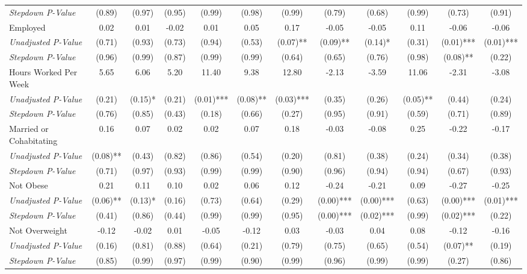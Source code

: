 \begin{tabular}{l c c c c c c c c c c c}
\quad \textit{Stepdown P-Value} & (0.89) & (0.97) & (0.95) & (0.99) & (0.98) & (0.99) & (0.79) & (0.68) & (0.99) & (0.73) & (0.91) \\
Employed & 0.02 & 0.01 & -0.02 & 0.01 & 0.05 & 0.17 & -0.05 & -0.05 & 0.11 & -0.06 & -0.06 \\
\quad \textit{Unadjusted P-Value} & (0.71) & (0.93) & (0.73) & (0.94) & (0.53) & (0.07)** & (0.09)** & (0.14)* & (0.31) & (0.01)*** & (0.01)*** \\
\quad \textit{Stepdown P-Value} & (0.96) & (0.99) & (0.87) & (0.99) & (0.99) & (0.64) & (0.65) & (0.76) & (0.98) & (0.08)** & (0.22) \\
Hours Worked Per Week & 5.65 & 6.06 & 5.20 & 11.40 & 9.38 & 12.80 & -2.13 & -3.59 & 11.06 & -2.31 & -3.08 \\
\quad \textit{Unadjusted P-Value} & (0.21) & (0.15)* & (0.21) & (0.01)*** & (0.08)** & (0.03)*** & (0.35) & (0.26) & (0.05)** & (0.44) & (0.24) \\
\quad \textit{Stepdown P-Value} & (0.76) & (0.85) & (0.43) & (0.18) & (0.66) & (0.27) & (0.95) & (0.91) & (0.59) & (0.71) & (0.89) \\
Married or Cohabitating & 0.16 & 0.07 & 0.02 & 0.02 & 0.07 & 0.18 & -0.03 & -0.08 & 0.25 & -0.22 & -0.17 \\
\quad \textit{Unadjusted P-Value} & (0.08)** & (0.43) & (0.82) & (0.86) & (0.54) & (0.20) & (0.81) & (0.38) & (0.24) & (0.34) & (0.38) \\
\quad \textit{Stepdown P-Value} & (0.71) & (0.97) & (0.93) & (0.99) & (0.99) & (0.90) & (0.96) & (0.94) & (0.94) & (0.67) & (0.93) \\
Not Obese & 0.21 & 0.11 & 0.10 & 0.02 & 0.06 & 0.12 & -0.24 & -0.21 & 0.09 & -0.27 & -0.25 \\
\quad \textit{Unadjusted P-Value} & (0.06)** & (0.13)* & (0.16) & (0.73) & (0.64) & (0.29) & (0.00)*** & (0.00)*** & (0.63) & (0.00)*** & (0.01)*** \\
\quad \textit{Stepdown P-Value} & (0.41) & (0.86) & (0.44) & (0.99) & (0.99) & (0.95) & (0.00)*** & (0.02)*** & (0.99) & (0.02)*** & (0.22) \\
Not Overweight & -0.12 & -0.02 & 0.01 & -0.05 & -0.12 & 0.03 & -0.03 & 0.04 & 0.08 & -0.12 & -0.16 \\
\quad \textit{Unadjusted P-Value} & (0.16) & (0.81) & (0.88) & (0.64) & (0.21) & (0.79) & (0.75) & (0.65) & (0.54) & (0.07)** & (0.19) \\
\quad \textit{Stepdown P-Value} & (0.85) & (0.99) & (0.97) & (0.99) & (0.90) & (0.99) & (0.96) & (0.99) & (0.99) & (0.27) & (0.86) \\

\end{tabular}
